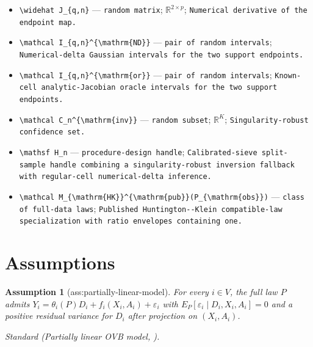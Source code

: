 \documentclass{article}
\newtheorem{assumption}{Assumption}
\begin{document}
\begin{itemize}
  \item \texttt{\textbackslash{}\allowbreak{}widehat J\_\allowbreak{}\{q,\allowbreak{}n\}\allowbreak{}} --- \texttt{random matrix}; \(\mathbb R^{2\times p}\); \texttt{Numerical derivative of the endpoint map.}
  \item \texttt{\textbackslash{}\allowbreak{}mathcal I\_\allowbreak{}\{q,\allowbreak{}n\}\allowbreak{}\textasciicircum{}\{\textbackslash{}\allowbreak{}mathrm\{ND\}\allowbreak{}\}\allowbreak{}} --- \texttt{pair of random intervals}; \texttt{Numerical-\allowbreak{}delta Gaussian intervals for the two support endpoints.}
  \item \texttt{\textbackslash{}\allowbreak{}mathcal I\_\allowbreak{}\{q,\allowbreak{}n\}\allowbreak{}\textasciicircum{}\{\textbackslash{}\allowbreak{}mathrm\{or\}\allowbreak{}\}\allowbreak{}} --- \texttt{pair of random intervals}; \texttt{Known-\allowbreak{}cell analytic-\allowbreak{}Jacobian oracle intervals for the two support endpoints.}
  \item \texttt{\textbackslash{}\allowbreak{}mathcal C\_\allowbreak{}n\textasciicircum{}\{\textbackslash{}\allowbreak{}mathrm\{inv\}\allowbreak{}\}\allowbreak{}} --- \texttt{random subset}; \(\mathbb R^K\); \texttt{Singularity-\allowbreak{}robust confidence set.}
  \item \texttt{\textbackslash{}\allowbreak{}mathsf H\_\allowbreak{}n} --- \texttt{procedure-\allowbreak{}design handle}; \texttt{Calibrated-\allowbreak{}sieve split-\allowbreak{}sample handle combining a singularity-\allowbreak{}robust inversion fallback with regular-\allowbreak{}cell numerical-\allowbreak{}delta inference.}
  \item \texttt{\textbackslash{}\allowbreak{}mathcal M\_\allowbreak{}\{\textbackslash{}\allowbreak{}mathrm\{HK\}\allowbreak{}\}\allowbreak{}\textasciicircum{}\{\textbackslash{}\allowbreak{}mathrm\{pub\}\allowbreak{}\}\allowbreak{}(P\_\allowbreak{}\{\textbackslash{}\allowbreak{}mathrm\{obs\}\allowbreak{}\}\allowbreak{})} --- \texttt{class of full-\allowbreak{}data laws}; \texttt{Published Huntington-\allowbreak{}-\allowbreak{}Klein compatible-\allowbreak{}law specialization with ratio envelopes containing one.}
\end{itemize}

\section{Assumptions}

\begin{assumption}[ass:partially-linear-model]\label{ass:partially-linear-model}
For every \(i\in V\), the full law \(P\) admits \(Y_i=\theta_i(P)D_i+f_i(X_i,A_i)+\varepsilon_i\) with \(E_P[\varepsilon_i\mid D_i,X_i,A_i]=0\) and a positive residual variance for \(D_i\) after projection on \((X_i,A_i)\).
\par\smallskip\noindent\emph{Standard} (Partially linear OVB model, \cite{HuntingtonKlein2026}).
\end{assumption}
\end{document}

